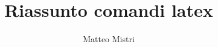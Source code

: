 \documentclass[a4paper,12pt]{report} %
\begin{document}

\title{Riassunto comandi latex} 
\author{Matteo Mistri}
\maketitle %
\tableofcontents %


\end{document}
